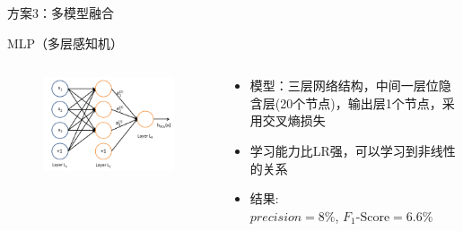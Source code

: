 \documentclass{beamer}
\begin{document}
\begin{frame}{方案3：多模型融合}

MLP（多层感知机）

\begin{columns}[c]

\begin{column}{0.5\linewidth}
\begin{figure}
\includegraphics[width=\linewidth]{./MLP}
\end{figure}
\end{column}

\begin{column}{0.5\linewidth}
\begin{itemize}
\item 模型：三层网络结构，中间一层位隐含层(20个节点)，输出层1个节点，采用交叉熵损失
\item 学习能力比LR强，可以学习到非线性的关系
\item {结果: \\$precision = 8\%$, $F_1\mbox{-Score} = 6.6\%$}
\end{itemize}
\end{column}

\end{columns}

\end{frame}
\end{document}
